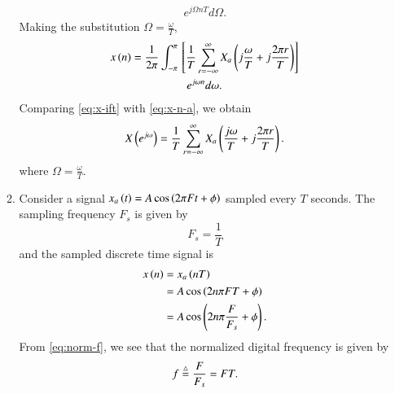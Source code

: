 \documentclass[journal,12pt,twocolumn]{IEEEtran}
\begin{document}
\begin{enumerate}[label=\theenumi.]
\begin{enumerate}
\begin{multline}
            e^{j\Omega{}nT}d\Omega.
        \end{multline}
        Making the substitution \(\Omega = \frac{\omega}{T}\),
        \begin{multline}
            x\left(n\right) = \frac{1}{2\pi}\int_{-\pi}^{\pi}{}\left[\frac{1}{T}\sum_{r=-\infty}^{\infty}X_a\left(j\frac{\omega}{T}+j\frac{2\pi{}r}{T}\right)\right] \\
            e^{j\omega{}n}d\omega.
            \label{eq:x-n-a}
        \end{multline}
        Comparing \eqref{eq:x-ift} with \eqref{eq:x-n-a}, we obtain
        \begin{equation}
            X\left(e^{j\omega}\right) = \frac{1}{T}\sum_{r=-\infty}^{\infty}X_a\left(\frac{j\omega}{T} + j\frac{2\pi{}r}{T}\right).
            \label{eq:omega-rel}
        \end{equation}
        where \(\Omega = \frac{\omega}{T}\).

        \item Consider a signal \(x_a\left(t\right) = A\cos\left(2\pi{}Ft + \phi\right)\)
        sampled every \(T\) seconds. The sampling frequency \(F_s\) is given by
        \begin{equation}
            F_s = \frac{1}{T}
            \label{eq:F-s-t}
        \end{equation}
        and the sampled discrete time signal is
        \begin{align}
            x\left(n\right) &= x_a\left(nT\right) \\
            &= A\cos\left(2n\pi{}FT + \phi\right) \\
            &= A\cos\left(2n\pi{}\frac{F}{F_s} + \phi\right).
            \label{eq:norm-f}
        \end{align}
        From \eqref{eq:norm-f}, we see that the normalized digital frequency is
        given by
        \begin{equation}
            f \stackrel{\triangle}{=} \frac{F}{F_s} = FT.
            \label{eq:rel-f-F-T}
        \end{equation}


\end{enumerate}
\end{enumerate}
\end{document}
